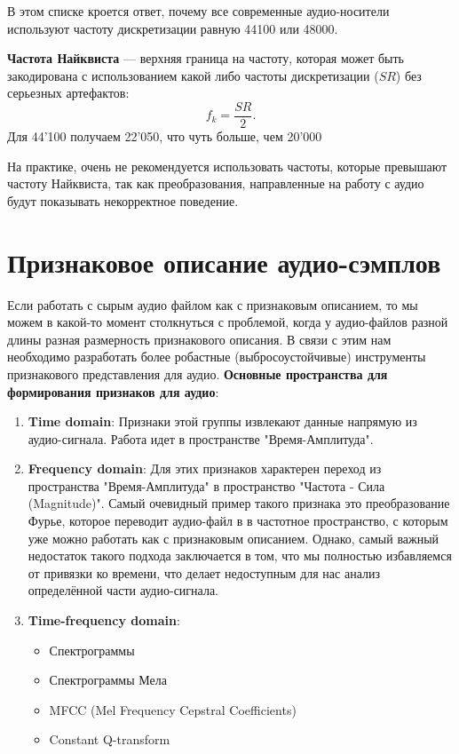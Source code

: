 \begin{remark}
    В этом списке кроется ответ, почему все современные аудио-носители используют частоту дискретизации равную 44100 или 48000.
\end{remark}

\begin{definition}
    \textbf{Частота Найквиста} --- верхняя граница на частоту, которая может быть закодирована с использованием какой либо частоты дискретизации ($SR$) без серьезных артефактов:
    \[
        f_k=\dfrac{SR}{2}.
    \]
    Для 44'100 получаем 22'050, что чуть больше, чем 20'000
\end{definition}

\begin{remark}
    На практике, очень не рекомендуется использовать частоты, которые превышают частоту Найквиста, так как преобразования, направленные на работу с аудио будут показывать некорректное поведение.
\end{remark}

\section{Признаковое описание аудио-сэмплов}

Если работать с сырым аудио файлом как с признаковым описанием, то мы можем в какой-то момент столкнуться с проблемой, когда у аудио-файлов разной длины разная размерность признакового описания. В связи с этим нам необходимо разработать более робастные (выбросоустойчивые) инструменты признакового представления для аудио.\newline
\textbf{Основные пространства для формирования признаков для аудио}:
\begin{enumerate}
    \item \textbf{Time domain}: Признаки этой группы извлекают данные напрямую из аудио-сигнала. Работа идет в пространстве "Время-Амплитуда".
    \item \textbf{Frequency domain}: Для этих признаков характерен переход из пространства "Время-Амплитуда" в пространство "Частота - Сила (Magnitude)". Самый очевидный пример такого признака это преобразование Фурье, которое переводит аудио-файл в в частотное пространство, с которым уже можно работать как с признаковым описанием. Однако, самый важный недостаток такого подхода заключается в том, что мы полностью избавляемся от привязки ко времени, что делает недоступным для нас анализ определённой части аудио-сигнала.
    \item \textbf{Time-frequency domain}:
    \begin{itemize}
        \item Спектрограммы
        \item Спектрограммы Мела
        \item MFCC (Mel Frequency Cepstral Coefficients)
        \item Constant Q-transform
    \end{itemize}
\end{enumerate}

